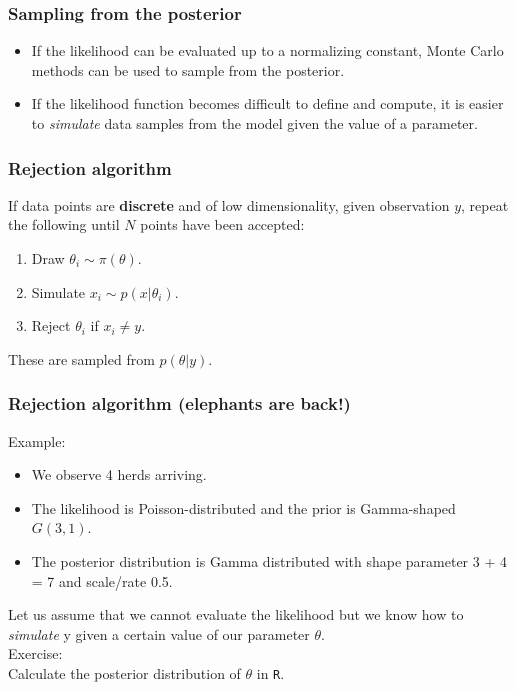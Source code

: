 \documentclass{beamer}
\newcommand{\1}{\ensuremath{\mathbf{1}}}
\begin{document}
\begin{frame}\frametitle{Sampling from the posterior}
	\begin{itemize}
		\item If the likelihood can be evaluated up to a normalizing constant, Monte Carlo methods can be used to sample from the posterior.
		\item If the likelihood function becomes difficult to define and compute, it is easier to \emph{simulate} data samples from the model given the value of a parameter.
	\end{itemize}
\end{frame}
%
%
%
\begin{frame}\frametitle{Rejection algorithm}
	If data points are \textbf{discrete} and of low dimensionality, given observation $y$, repeat the following until $N$ points have been accepted:
	\begin{enumerate}
		\item Draw $\theta_i \sim \pi(\theta)$.
		\item Simulate $x_i \sim p(x|\theta_i)$.
		\item Reject $\theta_i$ if $x_i \neq y$.
	\end{enumerate}
	These are sampled from $p(\theta|y)$.
\end{frame}
%
%
%
\begin{frame}\frametitle{Rejection algorithm (elephants are back!)}
	Example:
	\begin{itemize}
		\item We observe 4 herds arriving.
		\item The likelihood is Poisson-distributed and the prior is Gamma-shaped $G(3,1)$.
		\item The posterior distribution is Gamma distributed with shape parameter 3 + 4 = 7 and scale/rate 0.5.
	\end{itemize}
	Let us assume that we cannot evaluate the likelihood but we know how to \emph{simulate} y given a certain value of our parameter $\theta$.\\
	Exercise:\\
	Calculate the posterior distribution of $\theta$ in \texttt{R}.
\end{frame}
\end{document}
